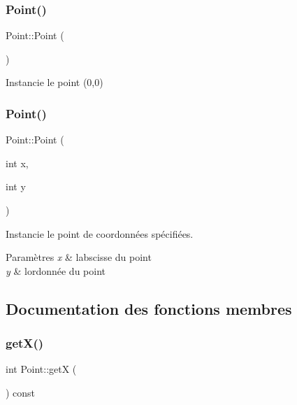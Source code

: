 \subsubsection{\texorpdfstring{Point()}{Point()}\hspace{0.1cm}{\footnotesize\ttfamily [1/2]}}
{\footnotesize\ttfamily Point\+::\+Point (\begin{DoxyParamCaption}{ }\end{DoxyParamCaption})\hspace{0.3cm}{\ttfamily [default]}}

Instancie le point (0,0) \mbox{\label{class_point_a001c4958c310b248f5c26037aea38a9c}} 
\subsubsection{\texorpdfstring{Point()}{Point()}\hspace{0.1cm}{\footnotesize\ttfamily [2/2]}}
{\footnotesize\ttfamily Point\+::\+Point (\begin{DoxyParamCaption}\item[{int}]{x,  }\item[{int}]{y }\end{DoxyParamCaption})}

Instancie le point de coordonnées spécifiées. 
\begin{DoxyParams}{Paramètres}
{\em x} & l\textquotesingle{}abscisse du point \\
\hline
{\em y} & l\textquotesingle{}ordonnée du point \\
\hline
\end{DoxyParams}


\subsection{Documentation des fonctions membres}
\mbox{\label{class_point_ac9d5859db121c7d1b89ca89266dca0a3}} 
\subsubsection{\texorpdfstring{getX()}{getX()}}
{\footnotesize\ttfamily int Point\+::getX (\begin{DoxyParamCaption}{ }\end{DoxyParamCaption}) const}

